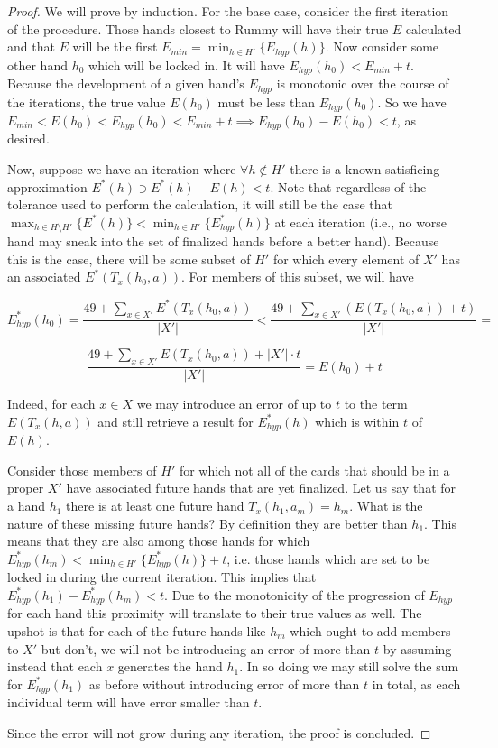 \documentclass[paper=a4, fontsize=11pt,twoside]{report}   %
\begin{document}
\begin{proof}
We will prove by induction. For the base case, consider the first iteration of the procedure. Those hands closest to Rummy will have their true $E$ calculated and that $E$ will be the first $E_{min} = \min_{h \in H'} \{E_{hyp}(h)\}$. Now consider some other hand $h_0$ which will be locked in. It will have $E_{hyp}(h_0) < E_{min} + t$. Because the development of a given hand's $E_{hyp}$ is monotonic over the course of the iterations, the true value $E(h_0)$ must be less than $E_{hyp}(h_0)$. So we have $E_{min} < E(h_0) < E_{hyp}(h_0) < E_{min} + t \implies E_{hyp}(h_0) - E(h_0) < t$, as desired.

Now, suppose we have an iteration where $\forall h \notin H'$ there is a known satisficing approximation $E^*(h) \ni E^*(h) - E(h) < t$. Note that regardless of the tolerance used to perform the calculation, it will still be the case that $\max_{h \in H\setminus H'}\{E^*(h)\} < \min_{h \in H'}\{E_{hyp}^*(h)\}$ at each iteration (i.e., no worse hand may sneak into the set of finalized hands before a better hand). Because this is the case, there will be some subset of $H'$ for which every element of $X'$ has an associated $E^*(T_x(h_0,a))$. For members of this subset, we will have

$$E_{hyp}^*(h_0) = \frac{49+\sum_{x\in X'} E^*(T_x(h_0,a))}{|X'|} <  \frac{49+\sum_{x\in X'} (E(T_x(h_0,a))+t)}{|X'|} = $$

$$\frac{49+\sum_{x\in X'} E(T_x(h_0,a))+|X'| \cdot t}{|X'|} = E(h_0) + t$$

Indeed, for each $x \in X$ we may introduce an error of up to $t$ to the term $E(T_x(h,a))$ and still retrieve a result for $E_{hyp}^*(h)$ which is within $t$ of $E(h)$.

Consider those members of $H'$ for which not all of the cards that should be in a proper $X'$ have associated future hands that are yet finalized. Let us say that for a hand $h_1$ there is at least one future hand $T_x(h_1,a_m) = h_m$. What is the nature of these missing future hands? By definition they are better than $h_1$. This means that they are also among those hands for which $E_{hyp}^*(h_m) < \min_{h \in H'}\{E_{hyp}^*(h)\}+t$, i.e. those hands which are set to be locked in during the current iteration. This implies that $E_{hyp}^*(h_1)-E_{hyp}^*(h_m) < t$. Due to the monotonicity of the progression of $E_{hyp}$ for each hand this proximity will translate to their true values as well. The upshot is that for each of the future hands like $h_m$ which ought to add members to $X'$ but don't, we will not be introducing an error of more than $t$ by assuming instead that each $x$ generates the hand $h_1$. In so doing we may still solve the sum for $E_{hyp}^*(h_1)$ as before without introducing error of more than $t$ in total, as each individual term will have error smaller than $t$.

Since the error will not grow during any iteration, the proof is concluded.
\end{proof}
\end{document}
